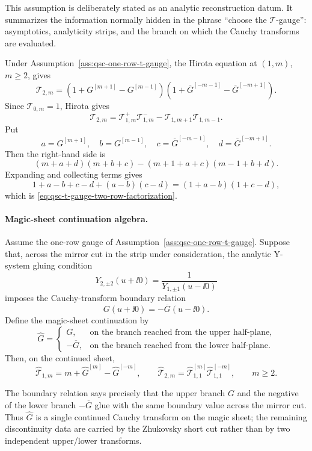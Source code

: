 This assumption is deliberately stated as an analytic reconstruction datum.  It
summarizes the information normally hidden in the phrase ``choose the
\(\mathcal T\)-gauge'': asymptotics, analyticity strips, and the branch on which
the Cauchy transforms are evaluated.

Under Assumption~\ref{ass:qsc-one-row-t-gauge}, the Hirota equation at
\((1,m)\), \(m\geq2\), gives
\begin{equation}
  \mathcal T_{2,m}
  =
  \left(1+G^{[m+1]}-G^{[m-1]}\right)
  \left(1+\overline G^{[-m-1]}-\overline G^{[-m+1]}\right).
  \label{eq:qsc-t-gauge-two-row-factorization}
\end{equation}
Since \(\mathcal T_{0,m}=1\), Hirota gives
\[
  \mathcal T_{2,m}
  =
  \mathcal T_{1,m}^+\mathcal T_{1,m}^-
  -
  \mathcal T_{1,m+1}\mathcal T_{1,m-1}.
\]
Put
\[
  a=G^{[m+1]},\quad b=G^{[m-1]},\quad
  c=\overline G^{[-m-1]},\quad d=\overline G^{[-m+1]}.
\]
Then the right-hand side is
\[
  (m+a+d)(m+b+c)-(m+1+a+c)(m-1+b+d).
\]
Expanding and collecting terms gives
\[
  1+a-b+c-d+(a-b)(c-d)=(1+a-b)(1+c-d),
\]
which is \eqref{eq:qsc-t-gauge-two-row-factorization}.

\paragraph{Magic-sheet continuation algebra.}
Assume the one-row gauge of Assumption~\ref{ass:qsc-one-row-t-gauge}.  Suppose
that, across the mirror cut in the strip under consideration, the analytic
Y-system gluing condition
\[
  Y_{2,\pm2}(u+\ii0)=\frac{1}{Y_{1,\pm1}(u-\ii0)}
\]
imposes the Cauchy-transform boundary relation
\[
  G(u+\ii0)=-\overline G(u-\ii0).
\]
Define the magic-sheet continuation by
\[
  \widehat G=
  \begin{cases}
    G, & \text{on the branch reached from the upper half-plane},\\
    -\overline G, & \text{on the branch reached from the lower half-plane}.
  \end{cases}
\]
Then, on the continued sheet,
\begin{equation}
  \widehat{\mathcal T}_{1,m}
  =
  m+\widehat G^{[m]}-\widehat G^{[-m]},
  \qquad
  \widehat{\mathcal T}_{2,m}
  =
  \widehat{\mathcal T}_{1,1}^{[m]}
  \widehat{\mathcal T}_{1,1}^{[-m]},
  \qquad m\geq2.
  \label{eq:qsc-magic-sheet-t-gauge}
\end{equation}

The boundary relation says precisely that the upper branch \(G\) and the
negative of the lower branch \(-\overline G\) glue with the same boundary
value across the mirror cut.  Thus \(\widehat G\) is a single continued Cauchy
transform on the magic sheet; the remaining discontinuity data are carried by
the Zhukovsky short cut rather than by two independent upper/lower transforms.

